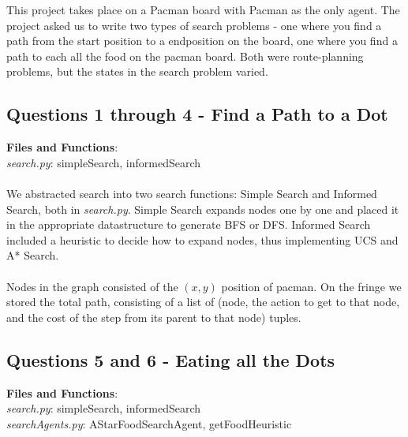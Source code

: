 \documentclass[]{article}
\begin{document}
This project takes place on a Pacman board with Pacman as the only agent. The project asked us to write two types of search problems - one where you find a path from the start position to a endposition on the board, one where you find a path to each all the food on the pacman board. Both were route-planning problems, but the states in the search problem varied.

\subsection{Questions 1 through 4 - Find a Path to a Dot}

\textbf{Files and Functions}: \\
\emph{search.py}: simpleSearch, informedSearch

\paragraph{}

We abstracted search into two search functions: Simple Search and Informed Search, both in \emph{search.py}. Simple Search expands nodes one by one and placed it in the appropriate datastructure to generate BFS or DFS. Informed Search included a heuristic to decide how to expand nodes, thus implementing UCS and A* Search.

\paragraph{}

Nodes in the graph consisted of the $(x,y)$ position of pacman. On the fringe we stored the total path, consisting of a list of (node, the action to get to that node, and the cost of the step from its parent to that node) tuples.

\subsection{Questions 5 and 6 - Eating all the Dots}

\textbf{Files and Functions}: \\
\emph{search.py}: simpleSearch, informedSearch\\
\emph{searchAgents.py}: AStarFoodSearchAgent, getFoodHeuristic

\paragraph{}
\end{document}
